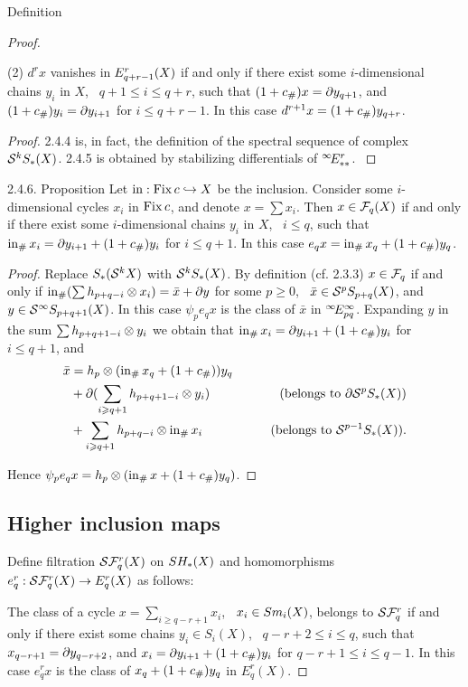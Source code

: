 \documentclass{article}
\begin{document}
\begin{subsubsection}{ Definition}
\begin{proof}
{\begin{proclaim}
{(2) $d^rx$ vanishes in $\E/r/q+r-1/(X)$ if and only if there exist some
$i$-dimensional chains $y_i$ in $X$, \ $q+1\le i\le q+r$, such that
$(1+c_\#)x=\partial y_{q+1}$, and $(1+c_\#)y_i=\partial y_{i+1}$ for $i\le q+r-1$.
In this case $d^{r+1}x=(1+c_\#)y_{q+r}$.
}\end{proclaim}
\begin{proof}{ 2.4.4 is, in fact, the definition of the spectral
sequence of complex $\mathcal S^kS_*(X)$. 2.4.5 is obtained
by stabilizing differentials of $\E\infty/r/**/$. 
}\end{proof}
\begin{proclaim}{{2.4.6. Proposition} Let $\operatorname{in}:\operatorname{Fix} c\hookrightarrow X$ be the inclusion.
Consider some $i$-dimensional cycles $x_i$  in $\operatorname{Fix} c$, and denote
$x=\sum x_i$. Then $x\in\mathcal F_q(X)$ if and only if there exist some
$i$-dimensional chains $y_i$ in $X$, \ $i\le q$, such that
$\operatorname{in}_\# x_i=\partial y_{i+1}+(1+c_\#)y_i$ for $i\le q+1$. In this case
$e_qx=\operatorname{in}_\# x_q+(1+c_\#)y_q$.
}\end{proclaim}
\begin{proof}{ Replace $S_*(\mathcal S^kX)$ with $\mathcal S^kS_*(X)$. By definition
(cf. 2.3.3) $x\in\mathcal F_q$ if and only if 
$\operatorname{in}_\#(\sum h_{p+q-i}\otimes x_i)=\bar x+\partial y$ for some $p\ge0$, \
$\bar x\in \mathcal S^pS_{p+q}(X)$, and $y\in \mathcal S^\infty S_{p+q+1}(X)$.
In this case $\psi_pe_qx$ is the class of $\bar x$ in $\E\infty/\infty/pq/$. 
Expanding $y$ in the sum $\sum h_{p+q+1-i}\otimes y_i$ we obtain that
$\operatorname{in}_\# x_i=\partial y_{i+1}+(1+c_\#)y_i$ for $i\le q+1$, and
\begin{align}
\bar x&=h_p\otimes(\operatorname{in}_\# x_q+(1+c_\#))y_q\\
      &+\partial(\sum_{i\geqslant q+1}h_{p+q+1-i}\otimes y_i)
&\qquad\text{(belongs to }\partial \mathcal S^pS_*(X))\\
      &+\sum_{i\geqslant q+1}h_{p+q-i}\otimes\operatorname{in}_\# x_i
&\qquad\text{(belongs to }\mathcal S^{p-1}S_*(X)).
\end{align}

Hence $\psi_pe_qx=h_p\otimes(\operatorname{in}_\# x+(1+c_\#)y_q)$. 
}\end{proof}
\subsection{Higher inclusion maps }
Define filtration $\mathcal S\mathcal F_q^r(X)$ on $SH_*(X)$ and homomorphisms 
$e_q^r:\mathcal S\mathcal F_q^r(X)\to E_q^r(X)$ as follows:

The class of a cycle $x=\sum\limits_{i\ge q-r+1}x_i$, \ $x_i\in Sm_i(X)$,
belongs to $\mathcal S\mathcal F_q^r$ if and only if there exist some chains $y_i\in S_i(X)$, \
$q-r+2\le i\le q$, such that $x_{q-r+1}=\partial y_{q-r+2}$, and
$x_i=\partial y_{i+1}+(1+c_\#)y_i$ for $q-r+1\le i\le q-1$. In this case $e_q^rx$
is the class of $x_q+(1+c_\#)y_q$ in $E_q^r(X)$.

}
\end{proof}
\end{subsubsection}
\end{document}
